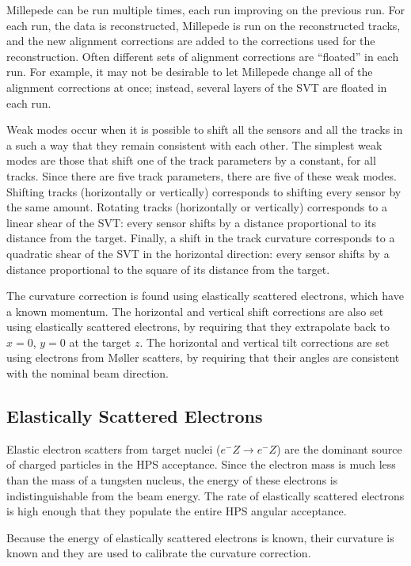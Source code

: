 Millepede can be run multiple times, each run improving on the previous run.
For each run, the data is reconstructed, Millepede is run on the reconstructed tracks, and the new alignment corrections are added to the corrections used for the reconstruction.
Often different sets of alignment corrections are ``floated'' in each run.
For example, it may not be desirable to let Millepede change all of the alignment corrections at once; instead, several layers of the SVT are floated in each run.

Weak modes occur when it is possible to shift all the sensors and all the tracks in a such a way that they remain consistent with each other.
The simplest weak modes are those that shift one of the track parameters by a constant, for all tracks.
Since there are five track parameters, there are five of these weak modes.
Shifting tracks (horizontally or vertically) corresponds to shifting every sensor by the same amount.
Rotating tracks (horizontally or vertically) corresponds to a linear shear of the SVT: every sensor shifts by a distance proportional to its distance from the target.
Finally, a shift in the track curvature corresponds to a quadratic shear of the SVT in the horizontal direction: every sensor shifts by a distance proportional to the square of its distance from the target.

The curvature correction is found using elastically scattered electrons, which have a known momentum.
The horizontal and vertical shift corrections are also set using elastically scattered electrons, by requiring that they extrapolate back to $x=0$, $y=0$ at the target $z$.
The horizontal and vertical tilt corrections are set using electrons from M{\o}ller scatters, by requiring that their angles are consistent with the nominal beam direction.

\subsection{Elastically Scattered Electrons}
\label{sec:target_z}
Elastic electron scatters from target nuclei ($e^- Z \to e^- Z$) are the dominant source of charged particles in the HPS acceptance.
Since the electron mass is much less than the mass of a tungsten nucleus, the energy of these electrons is indistinguishable from the beam energy.
The rate of elastically scattered electrons is high enough that they populate the entire HPS angular acceptance.

Because the energy of elastically scattered electrons is known, their curvature is known and they are used to calibrate the curvature correction.

